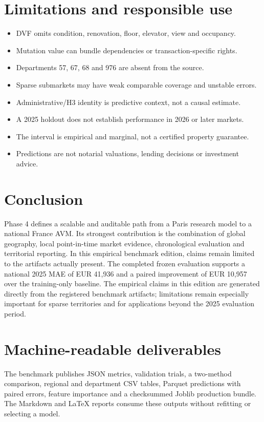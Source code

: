 \documentclass[11pt,a4paper]{article}
\begin{document}
\section{Limitations and responsible use}

\begin{itemize}[leftmargin=1.5em]
\item DVF omits condition, renovation, floor, elevator, view and occupancy.
\item Mutation value can bundle dependencies or transaction-specific rights.
\item Departments 57, 67, 68 and 976 are absent from the source.
\item Sparse submarkets may have weak comparable coverage and unstable errors.
\item Administrative/H3 identity is predictive context, not a causal estimate.
\item A 2025 holdout does not establish performance in 2026 or later markets.
\item The interval is empirical and marginal, not a certified property guarantee.
\item Predictions are not notarial valuations, lending decisions or investment advice.
\end{itemize}

\section{Conclusion}

Phase 4 defines a scalable and auditable path from a Paris research model to a
national France AVM. Its strongest contribution is the combination of global
geography, local point-in-time market evidence, chronological evaluation and
territorial reporting. In this empirical benchmark edition, claims remain limited to the
artifacts actually present. The completed frozen evaluation supports a national
2025 MAE of EUR 41,936 and a paired improvement of EUR
10,957 over the training-only baseline.
The empirical claims in this edition are generated directly from the registered
benchmark artifacts; limitations remain especially important for sparse territories
and for applications beyond the 2025 evaluation period.

\appendix
\section{Machine-readable deliverables}

The benchmark publishes JSON metrics, validation trials, a two-method comparison,
regional and department CSV tables, Parquet predictions with paired errors,
feature importance and a checksummed Joblib production bundle. The Markdown and
LaTeX reports consume these outputs without refitting or selecting a model.
\end{document}
